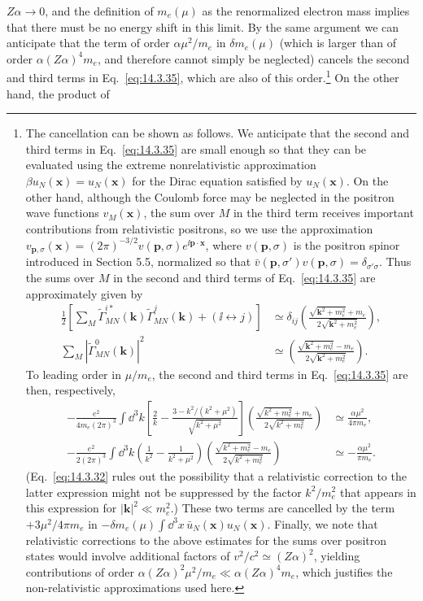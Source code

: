 $Z\alpha\to0$, and the definition of $m_e(\mu)$ as the renormalized electron
mass implies that there must be no energy shift in this limit. By the same
argument we can anticipate that the term of order $\alpha\mu^2/m_e$ in
$\delta m_e(\mu)$ (which is larger than of order $\alpha(Z\alpha)^4m_e$, and
therefore cannot simply be neglected) cancels the second and third terms in
Eq.~\eqref{eq:14.3.35}, which are also of this order.\footnote{The cancellation
can be shown as follows. We anticipate that the second and third terms in
Eq.~\eqref{eq:14.3.35} are small enough so that they can be evaluated using
the extreme nonrelativistic approximation $\beta u_N(\mathbf x)=u_N(\mathbf
x)$ for the Dirac equation satisfied by $u_N(\mathbf x)$. On the other hand,
although the Coulomb force may be neglected in the positron wave functions
$v_M(\mathbf x)$, the sum over $M$ in the third term receives important
contributions from relativistic positrons, so we use the approximation
$v_{\mathbf p,\sigma}(\mathbf x)=(2\pi)^{-3/2}v(\mathbf p,\sigma)
e^{\ii\mathbf p\cdot\mathbf x}$, where $v(\mathbf p,\sigma)$ is the positron
spinor introduced in Section 5.5, normalized so that
$\bar v(\mathbf p,\sigma')v(\mathbf p,\sigma)=\delta_{\sigma'\sigma}$.
Thus the sums over $M$ in the second and third terms of
Eq.~\eqref{eq:14.3.35} are approximately given by
\begin{align*}
\frac12\left[\sum_M\widetilde\Gamma_{MN}^{i*}(\mathbf k)
\widetilde\Gamma_{MN}^{j}(\mathbf k)+(\ii\leftrightarrow j)\right]
&\simeq\delta_{ij}\left(\frac{\sqrt{\mathbf k^2+m_e^2}+m_e}
{2\sqrt{\mathbf k^2+m_e^2}}\right),\\
\sum_M|\widetilde\Gamma_{MN}^0(\mathbf k)|^2
&\simeq\left(\frac{\sqrt{\mathbf k^2+m_e^2}-m_e}
{2\sqrt{\mathbf k^2+m_e^2}}\right).
\end{align*}
To leading order in $\mu/m_e$, the second and third terms in
Eq.~\eqref{eq:14.3.35} are then, respectively,
\begin{align*}
-\frac{e^2}{4m_e(2\pi)^3}\int \dd^3k
\left[\frac{2}{k}-\frac{3-k^2/(k^2+\mu^2)}{\sqrt{k^2+\mu^2}}\right]
\left(\frac{\sqrt{k^2+m_e^2}+m_e}{2\sqrt{k^2+m_e^2}}\right)
&\simeq\frac{\alpha\mu^2}{4\pi m_e},\\
-\frac{e^2}{2(2\pi)^3}\int \dd^3k
\left(\frac1{k^2}-\frac1{k^2+\mu^2}\right)
\left(\frac{\sqrt{k^2+m_e^2}-m_e}{2\sqrt{k^2+m_e^2}}\right)
&\simeq-\frac{\alpha\mu^2}{\pi m_e}.
\end{align*}
(Eq.~\eqref{eq:14.3.32} rules out the possibility that a relativistic
correction to the latter expression might not be suppressed by the factor
$k^2/m_e^2$ that appears in this expression for $|\mathbf k|^2\ll m_e^2$.)
These two terms are cancelled by the term $+3\mu^2/4\pi m_e$ in
$-\delta m_e(\mu)\int \dd^3x\,\bar u_N(\mathbf x)u_N(\mathbf x)$. Finally, we
note that relativistic corrections to the above estimates for the sums over
positron states would involve additional factors of $v^2/c^2\simeq(Z\alpha)^2$,
yielding contributions of order
$\alpha(Z\alpha)^2\mu^2/m_e\ll\alpha(Z\alpha)^4m_e$, which justifies the
non-relativistic approximations used here.} On the other hand, the product of
